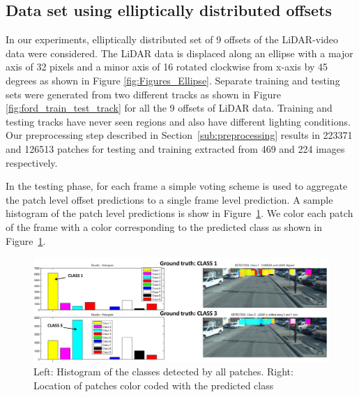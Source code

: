 \documentclass{article}
\begin{document}
\subsection{Data set using elliptically distributed offsets} %
\label{sub:9_class_tests}

In our experiments, elliptically distributed set of 9 offsets of the LiDAR-video data were considered. The LiDAR data is displaced along an ellipse with a major axis of 32 pixels and a minor axis of 16 rotated clockwise from x-axis by 45 degrees as shown in Figure \ref{fig:Figures_Ellipse}. Separate training and testing sets were generated from two different tracks as shown in Figure \ref{fig:ford_train_test_track} for all the 9 offsets of LiDAR data. Training and testing tracks have never seen regions and also have different lighting conditions. Our preprocessing step described in Section~\ref{sub:preprocessing} results in 223371 and 126513 patches for testing and training extracted from 469 and 224 images respectively.

In the testing phase, for each frame a simple voting scheme is used to aggregate the patch level offset predictions to a single frame level prediction. A sample histogram of the patch level predictions is show in Figure~\ref{fig:Figures_Voting}. We color each patch of the frame with a color corresponding to the predicted class as shown in Figure~\ref{fig:Figures_Voting}. 

\begin{figure}[htbp]
    \centering
        \includegraphics[scale=0.35]{Figures/Voting_final.png}
    \caption{Left: Histogram of the classes detected by all patches. Right: Location of patches color coded with the predicted class}
    \label{fig:Figures_Voting}
\end{figure}
\end{document}
